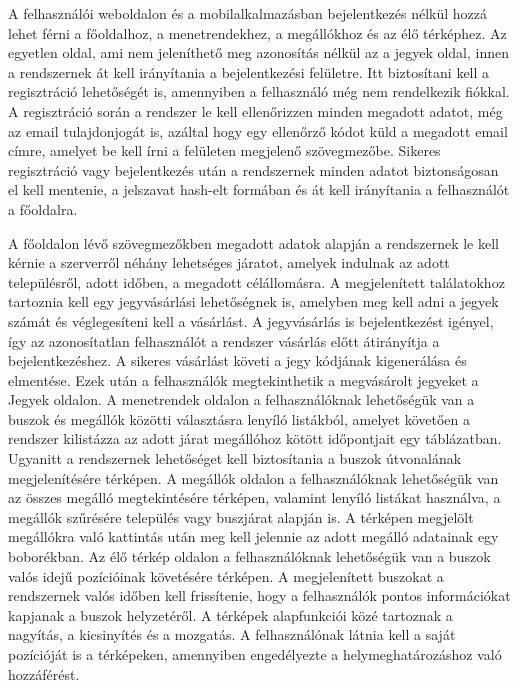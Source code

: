 A felhasználói weboldalon és a mobilalkalmazásban bejelentkezés nélkül hozzá lehet férni a főoldalhoz, a menetrendekhez, a megállókhoz és az élő térképhez. Az egyetlen oldal, ami nem jeleníthető meg azonosítás nélkül az a jegyek oldal, innen a rendszernek át kell irányítania a bejelentkezési felületre. Itt biztosítani kell a regisztráció lehetőségét is, amennyiben a felhasználó még nem rendelkezik fiókkal. A regisztráció során a rendszer le kell ellenőrizzen minden megadott adatot, még az email tulajdonjogát is, azáltal hogy egy ellenőrző kódot küld a megadott email címre, amelyet be kell írni a felületen megjelenő szövegmezőbe. Sikeres regisztráció vagy bejelentkezés után a rendszernek minden adatot biztonságosan el kell mentenie, a jelszavat hash-elt formában és át kell irányítania a felhasználót a főoldalra.

A főoldalon lévő szövegmezőkben megadott adatok alapján a rendszernek le kell kérnie a szerverről néhány lehetséges járatot, amelyek indulnak az adott településről, adott időben, a megadott célállomásra. A megjelenített találatokhoz tartoznia kell egy jegyvásárlási lehetőségnek is, amelyben meg kell adni a jegyek számát és véglegesíteni kell a vásárlást. A jegyvásárlás is bejelentkezést igényel, így az azonosítatlan felhasználót a rendszer vásárlás előtt átirányítja a bejelentkezéshez. A sikeres vásárlást követi a jegy kódjának kigenerálása és elmentése. Ezek után a felhasználók megtekinthetik a megvásárolt jegyeket a Jegyek oldalon. A menetrendek oldalon a felhasználóknak lehetőségük van a buszok és megállók közötti választásra lenyíló listákból, amelyet követően a rendszer kilistázza az adott járat megállóhoz kötött időpontjait egy táblázatban. Ugyanitt a rendszernek lehetőséget kell biztosítania a buszok útvonalának megjelenítésére térképen. A megállók oldalon a felhasználóknak lehetőségük van az összes megálló megtekintésére térképen, valamint lenyíló listákat használva, a megállók szűrésére település vagy buszjárat alapján is. A térképen megjelölt megállókra való kattintás után meg kell jelennie az adott megálló adatainak egy boborékban. Az élő térkép oldalon a felhasználóknak lehetőségük van a buszok valós idejű pozícióinak követésére térképen. A megjelenített buszokat a rendszernek valós időben kell frissítenie, hogy a felhasználók pontos információkat kapjanak a buszok helyzetéről. A térképek alapfunkciói közé tartoznak a nagyítás, a kicsinyítés és a mozgatás. A felhasználónak látnia kell a saját pozícióját is a térképeken, amennyiben engedélyezte a helymeghatározáshoz való hozzáférést.

